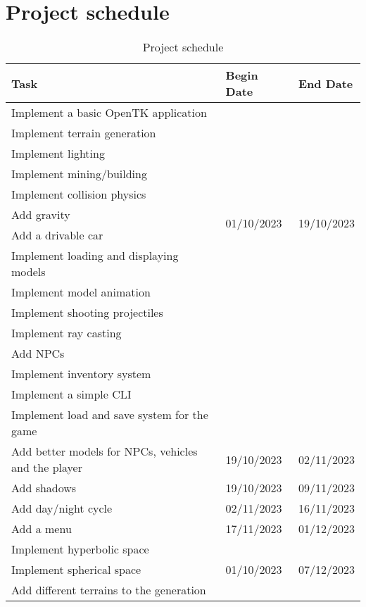 \documentclass[12pt]{article}
\begin{document}
\section{Project schedule} %

\begin{table}[H]
    \begin{tabular}{lll}
    \hline
        \textbf{Task} & \textbf{Begin Date} & \textbf{End Date} \\ \hline
        Implement a basic OpenTK application & \multirow{11}{*}{01/10/2023} & \multirow{11}{*}{19/10/2023} \\
        Implement terrain generation         &                              &  \\
        Implement lighting                   &                              &  \\
        Implement mining/building            &                              &  \\
        Implement collision physics          &                              &  \\
        Add gravity                          &                              &  \\       
        Add a drivable car                   &                              &  \\
        Implement loading and displaying models &                           &  \\
        Implement model animation &                                         &  \\
        Implement shooting projectiles &                                    &  \\ 
        Implement ray casting &                                             &  \\
        Add NPCs &                                                          &  \\
        Implement inventory system &                                        &  \\
        Implement a simple CLI                                              &  \\
        Implement load and save system for the game                         & \\ \hline
        Add better models for NPCs, vehicles and the player & 19/10/2023 & 02/11/2023 \\ \hline
        Add shadows & 19/10/2023 & 09/11/2023 \\ \hline
        Add day/night cycle & 02/11/2023 & 16/11/2023 \\ \hline
        Add a menu & 17/11/2023 & 01/12/2023 \\ \hline
        Implement hyperbolic space & \multirow{3}{*}{01/10/2023} & \multirow{3}{*}{07/12/2023} \\
        Implement spherical space &  &  \\ 
        Add different terrains to the generation &  & \\ \hline
    \end{tabular}
\caption{Project schedule}
\end{table}
\end{document}
